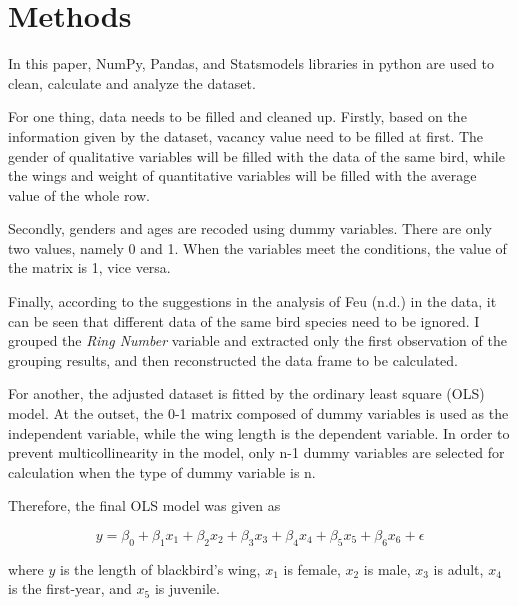 \section{Methods}
In this paper, NumPy, Pandas, and Statsmodels libraries in python are used to clean, calculate and analyze the dataset.

For one thing, data needs to be filled and cleaned up. Firstly, based on the information given by the dataset, vacancy value need to be filled at first. The gender of qualitative variables will be filled with the data of the same bird, while the wings and weight of quantitative variables will be filled with the average value of the whole row.

Secondly, genders and ages are recoded using dummy variables. There are only two values, namely 0 and 1. When the variables meet the conditions, the value of the matrix is 1, vice versa.

Finally, according to the suggestions in the analysis of Feu (n.d.) in the data, it can be seen that different data of the same bird species need to be ignored. I grouped the \textit{Ring Number} variable and extracted only the first observation of the grouping results, and then reconstructed the data frame to be calculated.

For another, the adjusted dataset is fitted by the ordinary least square (OLS) model. At the outset, the 0-1 matrix composed of dummy variables is used as the independent variable, while the wing length is the dependent variable. In order to prevent multicollinearity in the model, only n-1 dummy variables are selected for calculation when the type of dummy variable is n.

Therefore, the final OLS model was given as

\begin{equation}
	y = \beta_{0} + \beta_{1}x_{1} + \beta_{2}x_{2} + \beta_{3}x_{3} + \beta_{4}x_{4} + \beta_{5}x_{5} + \beta_{6}x_{6} + \epsilon
	\label{1}
\end{equation}

\noindent where $y$ is the length of blackbird's wing, $x_{1}$ is female, $x_{2}$ is male, $x_{3}$ is adult, $x_{4}$ is the first-year, and $x_{5}$ is juvenile.
